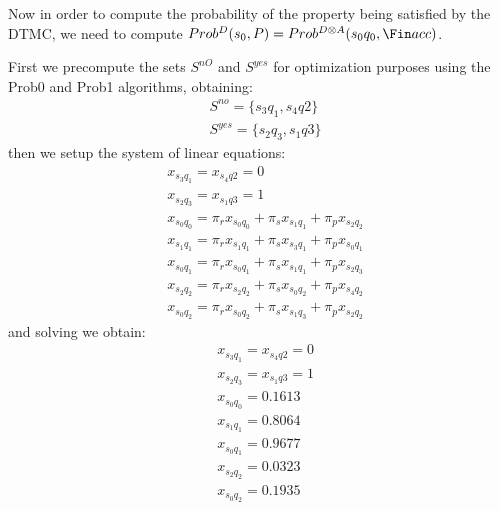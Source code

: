Now in order to compute the probability of the property being satisfied by the
DTMC, we need to compute
$Prob^D(s_0, P) = Prob^{D \otimes A}(s_0q_0, \Fin acc)$.

First we precompute the sets $S^{nO}$ and $S^{yes}$ for optimization purposes
using the Prob0 and Prob1 algorithms, obtaining:
\begin{align*}
	 & S^{no} = \{ s_3q_1, s_4q2 \}  \\
	 & S^{yes} = \{ s_2q_3, s_1q3 \}
\end{align*}
then we setup the system of linear equations:
\begin{align*}
	 & x_{s_3q_1} = x_{s_4q2} = 0                                          \\
	 & x_{s_2q_3} = x_{s_1q3} = 1                                          \\
	 & x_{s_0q_0} = \pi_r x_{s_0q_0} + \pi_s x_{s_1q_1} + \pi_p x_{s_2q_2} \\
	 & x_{s_1q_1} = \pi_r x_{s_1q_1} + \pi_s x_{s_3q_1} + \pi_p x_{s_0q_1} \\
	 & x_{s_0q_1} = \pi_r x_{s_0q_1} + \pi_s x_{s_1q_1} + \pi_p x_{s_2q_3} \\
	 & x_{s_2q_2} = \pi_r x_{s_2q_2} + \pi_s x_{s_0q_2} + \pi_p x_{s_4q_2} \\
	 & x_{s_0q_2} = \pi_r x_{s_0q_2} + \pi_s x_{s_1q_3} + \pi_p x_{s_2q_2}
\end{align*}
and solving we obtain:
\begin{align*}
	 & x_{s_3q_1} = x_{s_4q2} = 0 \\
	 & x_{s_2q_3} = x_{s_1q3} = 1 \\
	 & x_{s_0q_0} = 0.1613        \\
	 & x_{s_1q_1} = 0.8064        \\
	 & x_{s_0q_1} = 0.9677        \\
	 & x_{s_2q_2} = 0.0323        \\
	 & x_{s_0q_2} = 0.1935
\end{align*}
